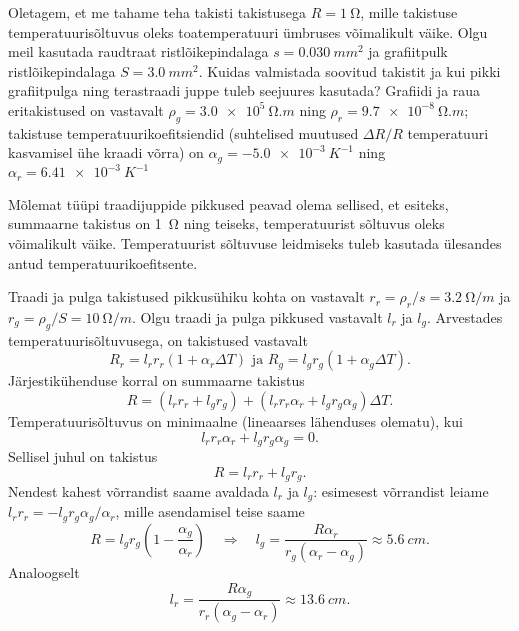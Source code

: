 
Oletagem, et me tahame teha takisti takistusega $R = \SI{1}{\ohm}$, mille takistuse temperatuurisõltuvus oleks toatemperatuuri ümbruses võimalikult väike. Olgu meil kasutada raudtraat ristlõikepindalaga $s = \SI{0,030}{mm^2}$ ja grafiitpulk ristlõikepindalaga $S = \SI{3,0}{mm^2}$. Kuidas valmistada soovitud takistit ja kui pikki grafiitpulga ning terastraadi juppe tuleb seejuures kasutada? Grafiidi ja raua eritakistused on vastavalt $\rho_g = \SI{3,0e5}{\ohm.m}$ ning $\rho_r = \SI{9,7e-8}{\ohm.m}$; takistuse temperatuurikoefitsiendid (suhtelised muutused $\Delta R/R$ temperatuuri kasvamisel ühe kraadi võrra) on $\alpha_g = \SI{-5,0e-3}{K^{-1}}$ ning $\alpha_r = \SI{6,41e-3}{K^{-1}}$

\hint
Mõlemat tüüpi traadijuppide pikkused peavad olema sellised, et esiteks, summaarne takistus on \SI{1}{\ohm} ning teiseks, temperatuurist sõltuvus oleks võimalikult väike. Temperatuurist sõltuvuse leidmiseks tuleb kasutada ülesandes antud temperatuurikoefitsente.

\solu
Traadi ja pulga takistused pikkusühiku kohta on vastavalt $r_r = \rho_r/s = \SI{3,2}{\ohm/m}$ ja $r_g = \rho_g/S = \SI{10}{\ohm/m}$. Olgu traadi ja pulga pikkused vastavalt $l_r$ ja $l_g$. Arvestades temperatuurisõltuvusega, on takistused vastavalt
\[
R_{r}=l_{r} r_{r}\left(1+\alpha_{r} \Delta T\right) \text { ja } R_{g}=l_{g} r_{g}\left(1+\alpha_{g} \Delta T\right).
\]
Järjestikühenduse korral on summaarne takistus
\[
R=\left(l_{r} r_{r}+l_{g} r_{g}\right)+\left(l_{r} r_{r} \alpha_{r}+l_{g} r_{g} \alpha_{g}\right) \Delta T.
\]
Temperatuurisõltuvus on minimaalne (lineaarses lähenduses olematu), kui
\[
l_{r} r_{r} \alpha_{r}+l_{g} r_{g} \alpha_{g}=0.
\]
Sellisel juhul on takistus
\[
R=l_{r} r_{r}+l_{g} r_{g}.
\]
Nendest kahest võrrandist saame avaldada $l_r$ ja $l_g$: esimesest võrrandist leiame $l_rr_r = -l_gr_g\alpha_g/\alpha_r$, mille asendamisel teise saame
\[
R=l_{g} r_{g}\left(1-\frac{\alpha_{g}}{\alpha_{r}}\right) \quad \Rightarrow \quad l_{g}=\frac{R \alpha_{r}}{r_{g}\left(\alpha_{r}-\alpha_{g}\right)} \approx \SI{5,6}{cm}.
\]
Analoogselt
\[
l_{r}=\frac{R \alpha_{g}}{r_{r}\left(\alpha_{g}-\alpha_{r}\right)} \approx \SI{13,6}{cm}.
\]
\probend